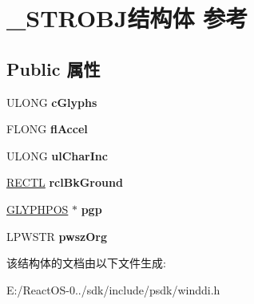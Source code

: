 \hypertarget{struct___s_t_r_o_b_j}{}\section{\+\_\+\+S\+T\+R\+O\+B\+J结构体 参考}
\label{struct___s_t_r_o_b_j}
\subsection*{Public 属性}
\begin{DoxyCompactItemize}
\item 
\mbox{\label{struct___s_t_r_o_b_j_a9d119516cba1daf7b6a845f5abe35041}} 
U\+L\+O\+NG {\bfseries c\+Glyphs}
\item 
\mbox{\label{struct___s_t_r_o_b_j_a648543bd2e8755eb374ce341dff430e0}} 
F\+L\+O\+NG {\bfseries fl\+Accel}
\item 
\mbox{\label{struct___s_t_r_o_b_j_af9fa2dab0dc2038a3d64875499a6559e}} 
U\+L\+O\+NG {\bfseries ul\+Char\+Inc}
\item 
\mbox{\label{struct___s_t_r_o_b_j_a5bb0c2f970afaa76ae42e6ac2887254d}} 
\hyperlink{struct___r_e_c_t_l}{R\+E\+C\+TL} {\bfseries rcl\+Bk\+Ground}
\item 
\mbox{\label{struct___s_t_r_o_b_j_a49da67bfee6ebb14ad87d6e33a6c365f}} 
\hyperlink{struct___g_l_y_p_h_p_o_s}{G\+L\+Y\+P\+H\+P\+OS} $\ast$ {\bfseries pgp}
\item 
\mbox{\label{struct___s_t_r_o_b_j_a68e12dc0076065578cb0315f3319aaf2}} 
L\+P\+W\+S\+TR {\bfseries pwsz\+Org}
\end{DoxyCompactItemize}


该结构体的文档由以下文件生成\+:\begin{DoxyCompactItemize}
\item 
E\+:/\+React\+O\+S-\/0../sdk/include/psdk/winddi.\+h\end{DoxyCompactItemize}
